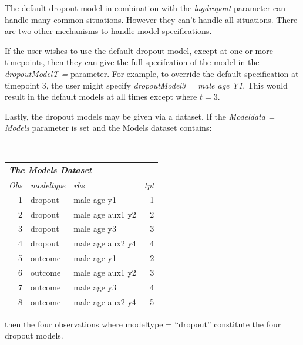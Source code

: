 \documentclass[10pt]{article}
\begin{document}
\begin{itemize}
The default dropout model in combination with the {\em lagdropout} parameter can handle many common situations.  However they can't handle all situations.  There are two other mechanisms to handle  model specifications.

If the user wishes to use the default dropout model, except at one or more timepoints, then they can give the full specifcation of the model in the {\em dropoutModelT = } parameter.  For example, to override the default specification at timepoint 3, the user might specify {\em dropoutModel3 = male age Y1}.  This would result in the default models at all times except where $t=3$.

Lastly, the dropout models may be given via a dataset.  If the {\em Modeldata = Models} parameter is set and the Models dataset contains:

{\ }\hspace{1in}\begin{minipage}[t]{4in}
\begin{spacing}{1.04}
\begin{tabular}[l]{|r|l|l|r|}
   \multicolumn{4}{l}{\normalsize\em The Models Dataset\rule[0.0in]{0.0in}{0.0in}} \\\hline
   {\normalsize\em\em Obs }& 
   {\normalsize\em\em modeltype}&
   {\normalsize\em\em rhs}&
   {\normalsize\em\em tpt}
\\\hline
 1  &    dropout &    male age y1        &  1 \\
 2  &    dropout &    male age aux1 y2   &  2 \\ 
 3  &    dropout &    male age y3        &  3 \\
 4  &    dropout &    male age aux2 y4   &  4 \\
 5  &    outcome &    male age y1        &  2 \\
 6  &    outcome &    male age aux1 y2   &  3 \\
 7  &    outcome &    male age y3        &  4 \\
 8  &    outcome &    male age aux2 y4   &  5 
\\\hline
\end{tabular}
\end{spacing}
\end{minipage}

then the four observations where modeltype = ``dropout'' constitute the four dropout models.


\end{itemize}
\end{document}
